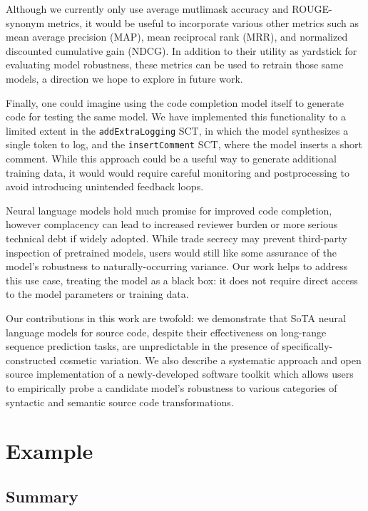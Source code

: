 \documentclass[usenames,dvipsnames]{article} %
\begin{document}
  Although we currently only use average mutlimask accuracy and ROUGE-synonym metrics, it would be useful to incorporate various other metrics such as mean average precision (MAP), mean reciprocal rank (MRR), and normalized discounted cumulative gain (NDCG). In addition to their utility as yardstick for evaluating model robustness, these metrics can be used to retrain those same models, a direction we hope to explore in future work.

  Finally, one could imagine using the code completion model itself to generate code for testing the same model. We have implemented this functionality to a limited extent in the \lstinline|addExtraLogging| SCT, in which the model synthesizes a single token to log, and the \lstinline|insertComment| SCT, where the model inserts a short comment. While this approach could be a useful way to generate additional training data, it would would require careful monitoring and postprocessing to avoid introducing unintended feedback loops.

  Neural language models hold much promise for improved code completion, however complacency can lead to increased reviewer burden or more serious technical debt if widely adopted. While trade secrecy may prevent third-party inspection of pretrained models, users would still like some assurance of the model's robustness to naturally-occurring variance. Our work helps to address this use case, treating the model as a black box: it does not require direct access to the model parameters or training data.

  Our contributions in this work are twofold: we demonstrate that SoTA neural language models for source code, despite their effectiveness on long-range sequence prediction tasks, are unpredictable in the presence of specifically-constructed cosmetic variation. We also describe a systematic approach and open source implementation of a newly-developed software toolkit which allows users to empirically probe a candidate model's robustness to various categories of syntactic and semantic source code transformations.
  \pagebreak
  
  \appendix

  \pagebreak
  \section{Example}
  \subsection{Summary}
\end{document}
